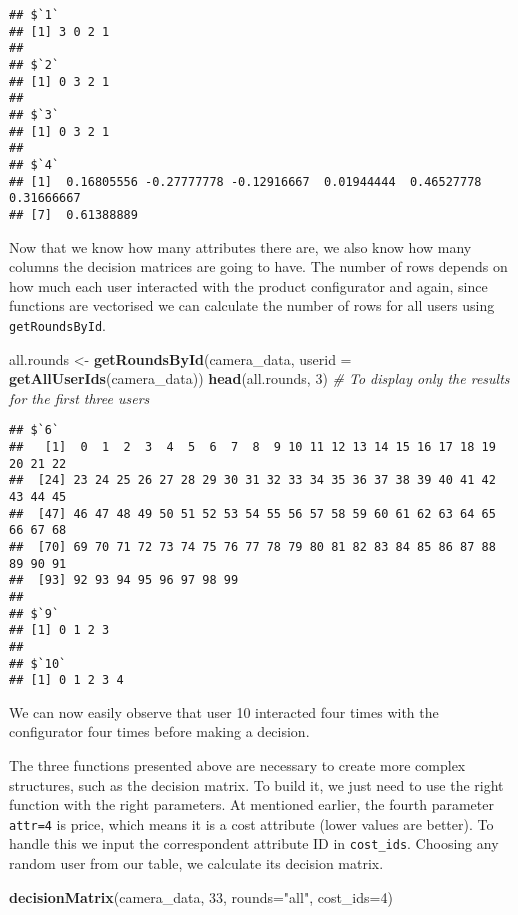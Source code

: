 \documentclass[]{article}
\newenvironment{Shaded}{\begin{snugshade}}{\end{snugshade}}
\newcommand{\KeywordTok}[1]{\textcolor[rgb]{0.13,0.29,0.53}{\textbf{{#1}}}}
\newcommand{\DataTypeTok}[1]{\textcolor[rgb]{0.13,0.29,0.53}{{#1}}}
\newcommand{\DecValTok}[1]{\textcolor[rgb]{0.00,0.00,0.81}{{#1}}}
\newcommand{\StringTok}[1]{\textcolor[rgb]{0.31,0.60,0.02}{{#1}}}
\newcommand{\CommentTok}[1]{\textcolor[rgb]{0.56,0.35,0.01}{\textit{{#1}}}}
\newcommand{\NormalTok}[1]{{#1}}
\begin{document}
\begin{verbatim}
## $`1`
## [1] 3 0 2 1
## 
## $`2`
## [1] 0 3 2 1
## 
## $`3`
## [1] 0 3 2 1
## 
## $`4`
## [1]  0.16805556 -0.27777778 -0.12916667  0.01944444  0.46527778  0.31666667
## [7]  0.61388889
\end{verbatim}

Now that we know how many attributes there are, we also know how many
columns the decision matrices are going to have. The number of rows
depends on how much each user interacted with the product configurator
and again, since functions are vectorised we can calculate the number of
rows for all users using \texttt{getRoundsById}.

\begin{Shaded}
\begin{Highlighting}[]
\NormalTok{all.rounds <-}\StringTok{ }\KeywordTok{getRoundsById}\NormalTok{(camera_data, }\DataTypeTok{userid =} \KeywordTok{getAllUserIds}\NormalTok{(camera_data))}
\KeywordTok{head}\NormalTok{(all.rounds, }\DecValTok{3}\NormalTok{) }\CommentTok{# To display only the results for the first three users}
\end{Highlighting}
\end{Shaded}

\begin{verbatim}
## $`6`
##   [1]  0  1  2  3  4  5  6  7  8  9 10 11 12 13 14 15 16 17 18 19 20 21 22
##  [24] 23 24 25 26 27 28 29 30 31 32 33 34 35 36 37 38 39 40 41 42 43 44 45
##  [47] 46 47 48 49 50 51 52 53 54 55 56 57 58 59 60 61 62 63 64 65 66 67 68
##  [70] 69 70 71 72 73 74 75 76 77 78 79 80 81 82 83 84 85 86 87 88 89 90 91
##  [93] 92 93 94 95 96 97 98 99
## 
## $`9`
## [1] 0 1 2 3
## 
## $`10`
## [1] 0 1 2 3 4
\end{verbatim}

We can now easily observe that user 10 interacted four times with the
configurator four times before making a decision.

The three functions presented above are necessary to create more complex
structures, such as the decision matrix. To build it, we just need to
use the right function with the right parameters. At mentioned earlier,
the fourth parameter \texttt{attr=4} is price, which means it is a cost
attribute (lower values are better). To handle this we input the
correspondent attribute ID in \texttt{cost\_ids}. Choosing any random
user from our table, we calculate its decision matrix.

\begin{Shaded}
\begin{Highlighting}[]
\KeywordTok{decisionMatrix}\NormalTok{(camera_data, }\DecValTok{33}\NormalTok{, }\DataTypeTok{rounds=}\StringTok{"all"}\NormalTok{, }\DataTypeTok{cost_ids=}\DecValTok{4}\NormalTok{)}
\end{Highlighting}
\end{Shaded}
\end{document}

